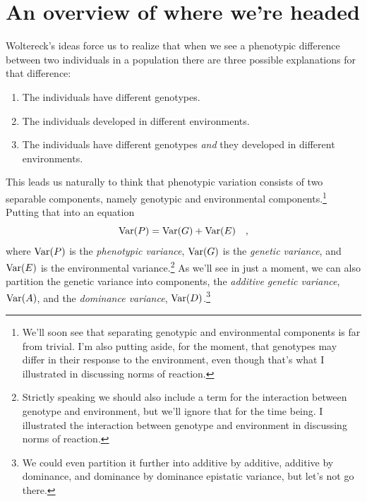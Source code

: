 \documentclass[12pt]{article}
\begin{document}
\section*{An overview of where we're headed}

Woltereck's ideas force us to realize that when we see a phenotypic
difference between two individuals in a population there are three
possible explanations for that difference:

\begin{enumerate}

\item The individuals have different genotypes.

\item The individuals developed in different environments.

\item The individuals have different genotypes {\it and\/} they
developed in different environments.

\end{enumerate}

\noindent This leads us naturally to think that phenotypic variation
consists of two separable components, namely genotypic and
environmental components.\footnote{We'll soon see that separating
  genotypic and environmental components is far from trivial. I'm also
  putting aside, for the moment, that genotypes may differ in their
  response to the environment, even though that's what I illustrated
  in discussing norms of reaction.} Putting that into an equation
\[
\mbox{Var}(P) = \mbox{Var}(G) + \mbox{Var}(E) \quad ,
\]
where $\mbox{Var}(P)$ is the {\it phenotypic variance}, $\mbox{Var}(G)$ is the
{\it genetic variance}, and $\mbox{Var}(E)$ is the environmental
variance.\footnote{Strictly speaking we should also include a term for
  the interaction between genotype and environment, but we'll ignore
  that for the time being. I illustrated the interaction between
  genotype and environment in discussing norms of reaction.} As
we'll see in just a moment, we can also partition the genetic variance
into components, the {\it additive genetic variance\/}, $\mbox{Var}(A)$, and
the {\it dominance variance}, $\mbox{Var}(D)$.\footnote{We could even
  partition it further into additive by additive, additive by
  dominance, and dominance by dominance epistatic variance, but let's
  not go there.}
\end{document}
